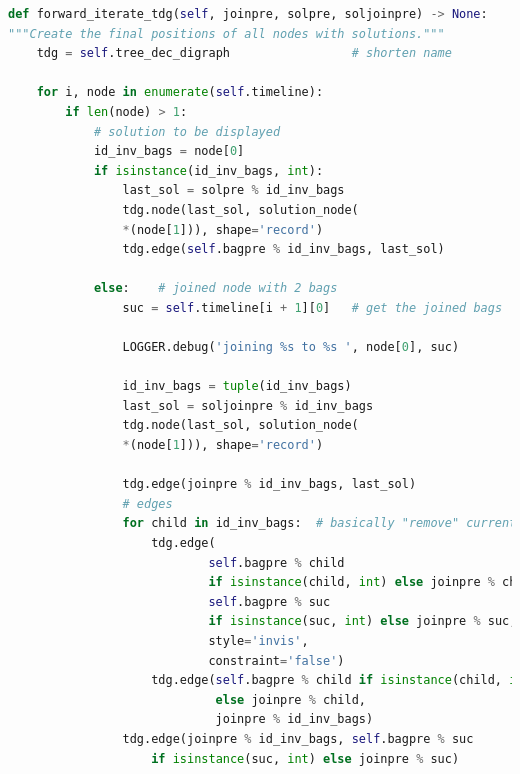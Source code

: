 \documentclass[a4paper, 12pt, bibliography=totoc]{scrartcl}
\begin{document}
\begin{lstlisting}[language={Python}, caption={forward\_iterate\_tdg}, label={lst:forward-iterate}]
def forward_iterate_tdg(self, joinpre, solpre, soljoinpre) -> None:
"""Create the final positions of all nodes with solutions."""
	tdg = self.tree_dec_digraph                 # shorten name
	
	for i, node in enumerate(self.timeline):
		if len(node) > 1:
			# solution to be displayed
			id_inv_bags = node[0]
			if isinstance(id_inv_bags, int):
				last_sol = solpre % id_inv_bags
				tdg.node(last_sol, solution_node(
				*(node[1])), shape='record')	
				tdg.edge(self.bagpre % id_inv_bags, last_sol)
			
			else:    # joined node with 2 bags
				suc = self.timeline[i + 1][0]   # get the joined bags
				
				LOGGER.debug('joining %s to %s ', node[0], suc)
				
				id_inv_bags = tuple(id_inv_bags)
				last_sol = soljoinpre % id_inv_bags
				tdg.node(last_sol, solution_node(
				*(node[1])), shape='record')
				
				tdg.edge(joinpre % id_inv_bags, last_sol)
				# edges
				for child in id_inv_bags:  # basically "remove" current
					tdg.edge(
							self.bagpre % child
							if isinstance(child, int) else joinpre % child,
							self.bagpre % suc
							if isinstance(suc, int) else joinpre % suc,
							style='invis',
							constraint='false')
					tdg.edge(self.bagpre % child if isinstance(child, int)
					         else joinpre % child,
					         joinpre % id_inv_bags)
				tdg.edge(joinpre % id_inv_bags, self.bagpre % suc
					if isinstance(suc, int) else joinpre % suc)
\end{lstlisting}
\end{document}
